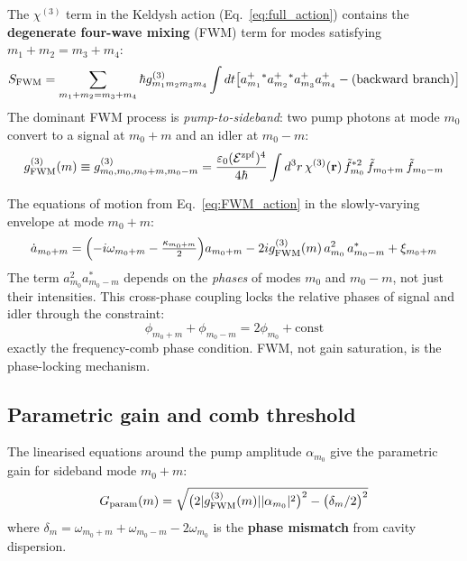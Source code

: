 \documentclass[12pt]{article}
\newcommand{\zpf}{{\rm zpf}}
\begin{document}
The $\chi^{(3)}$ term in the Keldysh action (Eq.~\ref{eq:full_action})
contains the \textbf{degenerate four-wave mixing} (FWM) term for modes
satisfying $m_1 + m_2 = m_3 + m_4$:
\begin{equation}
  S_{\rm FWM} = \sum_{\substack{m_1+m_2=m_3+m_4}}
  \hbar g^{(3)}_{m_1 m_2 m_3 m_4}
  \int dt\bigl[a_{m_1}^+{}^* a_{m_2}^+{}^* a_{m_3}^+ a_{m_4}^+
  - (\text{backward branch})\bigr]
  \label{eq:FWM_action}
\end{equation}
The dominant FWM process is \emph{pump-to-sideband}: two pump photons
at mode $m_0$ convert to a signal at $m_0+m$ and an idler at $m_0-m$:
\begin{equation}
  g^{(3)}_{\rm FWM}(m) \equiv
  g^{(3)}_{m_0,m_0,m_0+m,m_0-m} =
  \frac{\varepsilon_0(\mathcal{E}^\zpf)^4}{4\hbar}
  \int d^3r\,\chi^{(3)}(\mathbf{r})\,
  \tilde{f}_{m_0}^{*2}\,\tilde{f}_{m_0+m}\,\tilde{f}_{m_0-m}
  \label{eq:g3_FWM}
\end{equation}

The equations of motion from Eq.~\eqref{eq:FWM_action} in the
slowly-varying envelope at mode $m_0 + m$:
\begin{equation}
  \dot{a}_{m_0+m} = \Bigl(-i\omega_{m_0+m} - \tfrac{\kappa_{m_0+m}}{2}\Bigr)a_{m_0+m}
  - 2ig^{(3)}_{\rm FWM}(m)\,a_{m_0}^2\,a_{m_0-m}^* + \xi_{m_0+m}
  \label{eq:FWM_EOM}
\end{equation}
The term $a_{m_0}^2 a_{m_0-m}^*$ depends on the \emph{phases} of modes
$m_0$ and $m_0-m$, not just their intensities.  This cross-phase coupling
locks the relative phases of signal and idler through the constraint:
\begin{equation}
  \phi_{m_0+m} + \phi_{m_0-m} = 2\phi_{m_0} + \mathrm{const}
  \label{eq:phase_lock}
\end{equation}
exactly the frequency-comb phase condition.  FWM, not gain saturation,
is the phase-locking mechanism.

\subsection{Parametric gain and comb threshold}

The linearised equations around the pump amplitude $\alpha_{m_0}$ give
the parametric gain for sideband mode $m_0 + m$:
\begin{equation}
  G_{\rm param}(m) =
  \sqrt{\bigl(2|g^{(3)}_{\rm FWM}(m)||\alpha_{m_0}|^2\bigr)^2
  - \bigl(\delta_m/2\bigr)^2}
  \label{eq:param_gain}
\end{equation}
where $\delta_m = \omega_{m_0+m} + \omega_{m_0-m} - 2\omega_{m_0}$
is the \textbf{phase mismatch} from cavity dispersion.
\end{document}
